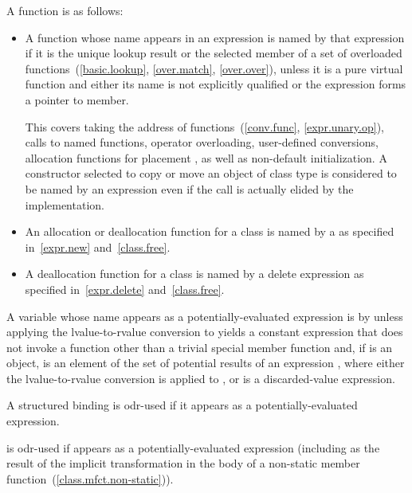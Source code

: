 \pnum
{}%
A function is  as follows:
\begin{itemize}
\item
  A function whose name appears in an expression
  is named by that expression
  if it is the unique lookup result or the selected member
  of a set of overloaded functions~(\ref{basic.lookup}, \ref{over.match}, \ref{over.over}),
  unless it is a pure virtual function and either
  its name is not explicitly qualified or
  the expression forms a pointer to member.
  \begin{note} This covers
  taking the address of functions~(\ref{conv.func}, \ref{expr.unary.op}),
  calls to named functions,
  operator overloading,
  user-defined conversions,
  allocation functions for placement , as well as
  non-default initialization.
  A constructor selected to copy or move an object of class type
  is considered to be named by an expression
  even if the call is actually elided by the implementation. \end{note}
\item
  An allocation or deallocation function for a class
  is named by a 
  as specified in~\ref{expr.new} and~\ref{class.free}.
\item
  A deallocation function for a class
  is named by a delete expression
  as specified in~\ref{expr.delete} and~\ref{class.free}.
\end{itemize}

\pnum
A variable  whose name appears as a
potentially-evaluated expression  is  by  unless
applying the lvalue-to-rvalue conversion to  yields
a constant expression
that does not invoke a function
other than a trivial special member function
and, if  is an object,  is an element of
the set of potential results of an expression , where either the lvalue-to-rvalue
conversion is applied to , or  is
a discarded-value expression.

\pnum
A structured binding is odr-used if it appears as a potentially-evaluated expression.

\pnum
{} is odr-used if  appears as a potentially-evaluated expression
(including as the result of the implicit transformation in the body of a non-static
member function~(\ref{class.mfct.non-static})).

